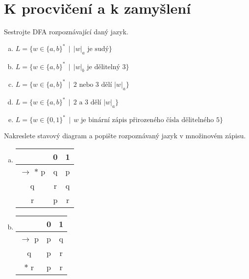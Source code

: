 \documentclass[a4paper,12pt]{amsart}
\begin{document}
\section*{K procvičení a k zamyšlení}


\medskip\begin{problem}
    
    Sestrojte DFA rozpoznávající daný jazyk.

    \medskip
    
    \begin{enumerate}[(a)]\setlength\itemsep{6pt}
        \item $L=\{w\in\{a,b\}^* \,\mid\, |w|_a \text{ je sudý}\}$
        \item $L=\{w\in\{a,b\}^* \,\mid\, |w|_b \text{ je dělitelný 3}\}$
        \item $L=\{w\in\{a,b\}^* \,\mid\, \text{2 nebo 3 dělí }|w|_a\}$
        \item $L=\{w\in\{a,b\}^* \,\mid\, \text{2 a 3 dělí }|w|_a\}$
        \item $L=\{w\in\{0,1\}^* \,\mid\, w\text{ je binární zápis přirozeného čísla dělitelného 5}\}$       
    \end{enumerate}

\end{problem}


\medskip\begin{problem}

    Nakreslete stavový diagram a popište rozpoznávaný jazyk v množinovém zápisu.

    \begin{multicols}{2}
    
        \begin{enumerate}[(a)]    
            \item \begin{tabular}{ c | c c }
            & 0 & 1 \\   \hline
            $\to$ $\ast$ p & q & p \\  
            q & r & q\\
            r & p & r
            \end{tabular}
    
        \columnbreak

            \item \begin{tabular}{ c | c c }
            & 0 & 1 \\   \hline
            $\to$ p & p & q \\  
            q & p & r\\
            $\ast$ r & p & r
            \end{tabular}

        \end{enumerate}

    \end{multicols}

\end{problem}
\end{document}
